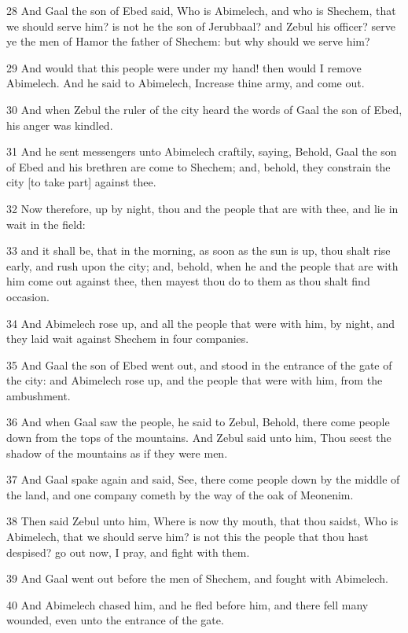 \par 28 And Gaal the son of Ebed said, Who is Abimelech, and who is Shechem, that we should serve him? is not he the son of Jerubbaal? and Zebul his officer? serve ye the men of Hamor the father of Shechem: but why should we serve him?
\par 29 And would that this people were under my hand! then would I remove Abimelech. And he said to Abimelech, Increase thine army, and come out.
\par 30 And when Zebul the ruler of the city heard the words of Gaal the son of Ebed, his anger was kindled.
\par 31 And he sent messengers unto Abimelech craftily, saying, Behold, Gaal the son of Ebed and his brethren are come to Shechem; and, behold, they constrain the city [to take part] against thee.
\par 32 Now therefore, up by night, thou and the people that are with thee, and lie in wait in the field:
\par 33 and it shall be, that in the morning, as soon as the sun is up, thou shalt rise early, and rush upon the city; and, behold, when he and the people that are with him come out against thee, then mayest thou do to them as thou shalt find occasion.
\par 34 And Abimelech rose up, and all the people that were with him, by night, and they laid wait against Shechem in four companies.
\par 35 And Gaal the son of Ebed went out, and stood in the entrance of the gate of the city: and Abimelech rose up, and the people that were with him, from the ambushment.
\par 36 And when Gaal saw the people, he said to Zebul, Behold, there come people down from the tops of the mountains. And Zebul said unto him, Thou seest the shadow of the mountains as if they were men.
\par 37 And Gaal spake again and said, See, there come people down by the middle of the land, and one company cometh by the way of the oak of Meonenim.
\par 38 Then said Zebul unto him, Where is now thy mouth, that thou saidst, Who is Abimelech, that we should serve him? is not this the people that thou hast despised? go out now, I pray, and fight with them.
\par 39 And Gaal went out before the men of Shechem, and fought with Abimelech.
\par 40 And Abimelech chased him, and he fled before him, and there fell many wounded, even unto the entrance of the gate.
